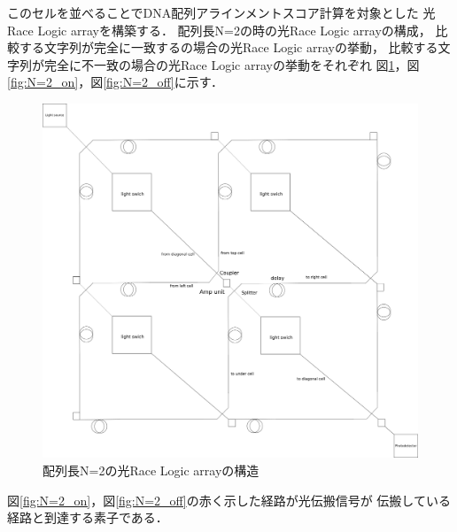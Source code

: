 このセルを並べることでDNA配列アラインメントスコア計算を対象とした
光Race Logic arrayを構築する．
配列長N=2の時の光Race Logic arrayの構成，
比較する文字列が完全に一致するの場合の光Race Logic arrayの挙動，
比較する文字列が完全に不一致の場合の光Race Logic arrayの挙動をそれぞれ
図\ref{fig:N=2}，図\ref{fig:N=2_on}，図\ref{fig:N=2_off}に示す．
\begin{figure}[t!]
\begin{center}
\includegraphics[keepaspectratio,scale=0.35]{fig/3/lightracelogic_N_2.png}
\caption{配列長N=2の光Race Logic arrayの構造}
\label{fig:N=2}
\end{center}
\end{figure}
図\ref{fig:N=2_on}，図\ref{fig:N=2_off}の赤く示した経路が光伝搬信号が
伝搬している経路と到達する素子である．
